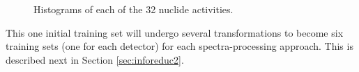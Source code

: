 \begin{figure}[!htb]
  \caption{Histograms of each of the 32 nuclide activities.}
  \label{fig:actshist}
\end{figure}

This one initial training set will undergo several transformations to become 
six training sets (one for each detector) for each spectra-processing approach.
This is described next in Section \ref{sec:inforeduc2}.
